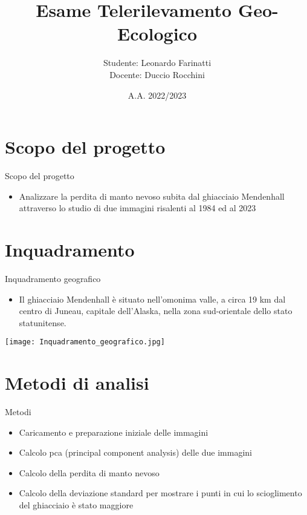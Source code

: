 \documentclass{beamer}
\title{Esame Telerilevamento Geo-Ecologico}
\institute{Alma Mater Studiorum - Università di Bologna\\Telerilevamento Geo-Ecologico}
\author{Studente: Leonardo Farinatti\\Docente: Duccio Rocchini }
\date{A.A. 2022/2023}
\begin{document}
\maketitle




\section{Scopo del progetto}

\begin{frame}{Scopo del progetto}
\begin{itemize}
    \item  Analizzare la perdita di manto nevoso subita dal ghiacciaio Mendenhall attraverso lo studio di due immagini risalenti al 1984 ed al 2023
\end{itemize}
\end{frame}

\section{Inquadramento}

\begin{frame}{Inquadramento geografico}
\begin{itemize}
    \item Il ghiacciaio Mendenhall è situato nell'omonima valle, a circa 19 km dal centro di Juneau, capitale dell'Alaska, nella zona sud-orientale dello stato statunitense. 
\end{itemize}
\texttt{[image: Inquadramento\_geografico.jpg]}
    \centering
\end{frame}

\section{Metodi di analisi}

\begin{frame}{Metodi}
\begin{itemize}
    \item Caricamento e preparazione iniziale delle immagini
    
    \item \pause Calcolo pca (principal component analysis) delle due immagini
    
    \item \pause Calcolo della perdita di manto nevoso
    
    \item \pause Calcolo della deviazione standard per mostrare i punti in cui lo scioglimento del ghiacciaio è stato maggiore
\end{itemize}    
\end{frame}
\end{document}
